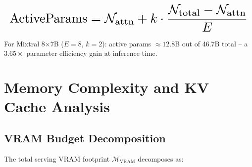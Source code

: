 \documentclass[10pt,journal,compsoc,twocolumn]{IEEEtran}
\begin{document}
\begin{equation}
\resizebox{\columnwidth}{!}{$\displaystyle
\begin{aligned}
\text{ActiveParams} = \mathcal{N}_{\text{attn}} + k \cdot \frac{\mathcal{N}_{\text{total}} - \mathcal{N}_{\text{attn}}}{E}
\end{aligned}
$}
\end{equation}

























For Mixtral 8$\times$7B ($E = 8$, $k = 2$): active params $\approx 12.8$B out of 46.7B total -- a $3.65\times$ parameter efficiency gain at inference time.




\section{Memory Complexity and KV Cache Analysis}



\subsection{VRAM Budget Decomposition}


The total serving VRAM footprint $\mathcal{M}_{\text{VRAM}}$ decomposes as:
\end{document}
